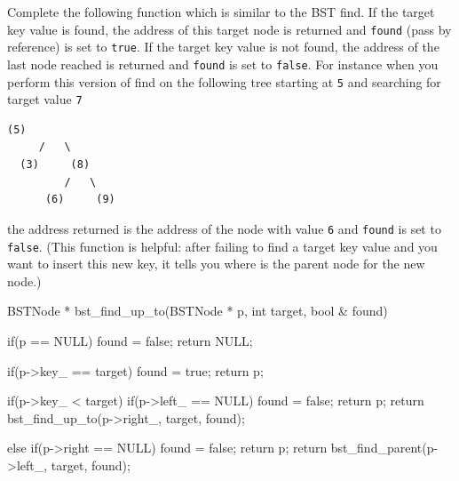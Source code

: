\nextq
Complete the following function which is similar to the BST find.
If the target key value is found, the address of this target node is
returned and \verb!found! (pass by reference) is set to \verb!true!.
If the target key value is not found, the address of the last node
reached is returned and \verb!found! is set to \verb!false!.
For instance when you perform this version of find
on the following tree starting at \verb!5!
and searching for target value \verb!7!
\begin{Verbatim}[frame=single,fontsize=\footnotesize]
      (5)
     /   \
  (3)     (8)
         /   \
      (6)     (9)
\end{Verbatim}
the address returned is the address of the node with value \verb!6!
and \verb!found! is set to \verb!false!.
(This function is helpful: after failing to find a target key value
and you want to insert this new key,
it tells you where is the parent node for the new node.)
\\
\ANSWER
\begin{answercode}
BSTNode * bst_find_up_to(BSTNode * p, int target, bool & found)
{
  if(p == NULL)
  {
    found = false;
    return NULL;
  }

  if(p->key_ == target)
  {
    found = true;
    return p;
  }

  if(p->key_ < target)
  {
    if(p->left_ == NULL)
    {
      found = false;
      return p;
    }
    return bst_find_up_to(p->right_, target, found);
  }
  
  else
  {
    if(p->right == NULL)
    {
      found = false;
      return p;
    }
    return bst_find_parent(p->left_, target, found);
  }
}
\end{answercode}



